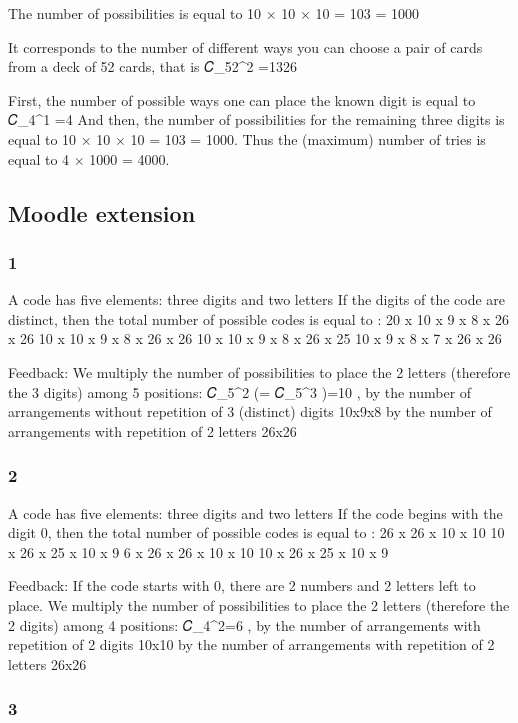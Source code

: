 \documentclass[
  letterpaper,
  DIV=11,
  numbers=noendperiod]{scrreprt}
\begin{document}
The number of possibilities is equal to 10 × 10 × 10 = 103 = 1000

It corresponds to the number of different ways you can choose a pair of
cards from a deck of 52 cards, that is 𝐶\_52\^{}2 =1326

First, the number of possible ways one can place the known digit is
equal to 𝐶\_4\^{}1 =4 And then, the number of possibilities for the
remaining three digits is equal to 10 × 10 × 10 = 103 = 1000. Thus the
(maximum) number of tries is equal to 4 × 1000 = 4000.

\subsection{Moodle extension}\label{moodle-extension}

\subsubsection{1}\label{section}

A code has five elements: three digits and two letters If the digits of
the code are distinct, then the total number of possible codes is equal
to : 20 x 10 x 9 x 8 x 26 x 26 10 x 10 x 9 x 8 x 26 x 26 10 x 10 x 9 x 8
x 26 x 25 10 x 9 x 8 x 7 x 26 x 26

Feedback: We multiply the number of possibilities to place the 2 letters
(therefore the 3 digits) among 5 positions: 𝐶\_5\^{}2 (= 𝐶\_5\^{}3 )=10
, by the number of arrangements without repetition of 3 (distinct)
digits 10x9x8 by the number of arrangements with repetition of 2 letters
26x26

\subsubsection{2}\label{section-1}

A code has five elements: three digits and two letters If the code
begins with the digit 0, then the total number of possible codes is
equal to : 26 x 26 x 10 x 10 10 x 26 x 25 x 10 x 9 6 x 26 x 26 x 10 x 10
10 x 26 x 25 x 10 x 9

Feedback: If the code starts with 0, there are 2 numbers and 2 letters
left to place. We multiply the number of possibilities to place the 2
letters (therefore the 2 digits) among 4 positions: 𝐶\_4\^{}2=6 , by the
number of arrangements with repetition of 2 digits 10x10 by the number
of arrangements with repetition of 2 letters 26x26

\subsubsection{3}\label{section-2}
\end{document}
